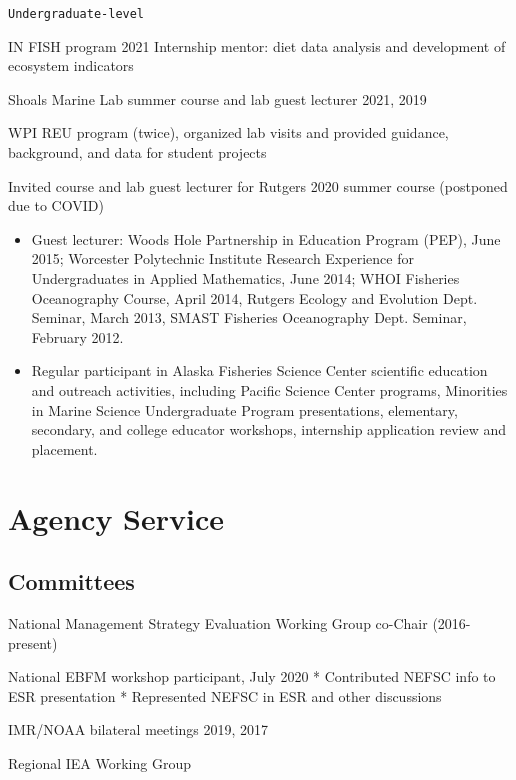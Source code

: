 \documentclass[11pt, a4paper]{awesome-cv}
\begin{document}
\begin{verbatim}
Undergraduate-level
\end{verbatim}

IN FISH program 2021 Internship mentor: diet data analysis and
development of ecosystem indicators

Shoals Marine Lab summer course and lab guest lecturer 2021, 2019

WPI REU program (twice), organized lab visits and provided guidance,
background, and data for student projects

Invited course and lab guest lecturer for Rutgers 2020 summer course
(postponed due to COVID)

\begin{itemize}
\item
  Guest lecturer: Woods Hole Partnership in Education Program (PEP),
  June 2015; Worcester Polytechnic Institute Research Experience for
  Undergraduates in Applied Mathematics, June 2014; WHOI Fisheries
  Oceanography Course, April 2014, Rutgers Ecology and Evolution Dept.
  Seminar, March 2013, SMAST Fisheries Oceanography Dept. Seminar,
  February 2012.
\item
  Regular participant in Alaska Fisheries Science Center scientific
  education and outreach activities, including Pacific Science Center
  programs, Minorities in Marine Science Undergraduate Program
  presentations, elementary, secondary, and college educator workshops,
  internship application review and placement.
\end{itemize}

\hypertarget{agency-service}{%
\section{Agency Service}\label{agency-service}}

\hypertarget{committees}{%
\subsection{Committees}\label{committees}}

National Management Strategy Evaluation Working Group co-Chair
(2016-present)

National EBFM workshop participant, July 2020 * Contributed NEFSC info
to ESR presentation * Represented NEFSC in ESR and other discussions

IMR/NOAA bilateral meetings 2019, 2017

Regional IEA Working Group
\end{document}
